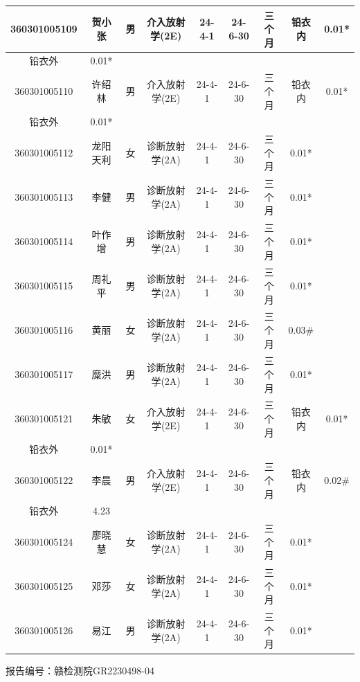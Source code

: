 \begin{table}[H]
\begin{tabular}{|c|c|c|c|c|c|c|c|c|}
\hline
360301005109 & 贺小张 & 男 & 介入放射学(2E) & 24-4-1 & 24-6-30 & 三个月 & 铅衣内 & 0.01* \\
\hline
铅衣外 & 0.01* &  &  &  &  &  &  &  \\
\hline
360301005110 & 许绍林 & 男 & 介入放射学(2E) & 24-4-1 & 24-6-30 & 三个月 & 铅衣内 & 0.01* \\
\hline
铅衣外 & 0.01* &  &  &  &  &  &  &  \\
\hline
360301005112 & 龙阳天利 & 女 & 诊断放射学(2A) & 24-4-1 & 24-6-30 & 三个月 & 0.01* &  \\
\hline
360301005113 & 李健 & 男 & 诊断放射学(2A) & 24-4-1 & 24-6-30 & 三个月 & 0.01* &  \\
\hline
360301005114 & 叶作增 & 男 & 诊断放射学(2A) & 24-4-1 & 24-6-30 & 三个月 & 0.01* &  \\
\hline
360301005115 & 周礼平 & 男 & 诊断放射学(2A) & 24-4-1 & 24-6-30 & 三个月 & 0.01* &  \\
\hline
360301005116 & 黄丽 & 女 & 诊断放射学(2A) & 24-4-1 & 24-6-30 & 三个月 & 0.03\# &  \\
\hline
360301005117 & 糜洪 & 男 & 诊断放射学(2A) & 24-4-1 & 24-6-30 & 三个月 & 0.01* &  \\
\hline
360301005121 & 朱敏 & 女 & 介入放射学(2E) & 24-4-1 & 24-6-30 & 三个月 & 铅衣内 & 0.01* \\
\hline
铅衣外 & 0.01* &  &  &  &  &  &  &  \\
\hline
360301005122 & 李晨 & 男 & 介入放射学(2E) & 24-4-1 & 24-6-30 & 三个月 & 铅衣内 & 0.02\# \\
\hline
铅衣外 & 4.23 &  &  &  &  &  &  &  \\
\hline
360301005124 & 廖晓慧 & 女 & 诊断放射学(2A) & 24-4-1 & 24-6-30 & 三个月 & 0.01* &  \\
\hline
360301005125 & 邓莎 & 女 & 诊断放射学(2A) & 24-4-1 & 24-6-30 & 三个月 & 0.01* &  \\
\hline
360301005126 & 易江 & 男 & 诊断放射学(2A) & 24-4-1 & 24-6-30 & 三个月 & 0.01* &  \\
\hline
\end{tabular}
\end{table}


报告编号：赣检测院GR2230498-04


